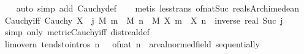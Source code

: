 \begin{isabellebody}
%
\isadelimproof
\ \ %
\endisadelimproof
%
\isatagproof
{}\isamarkupfalse%
\ {\isacharparenleft}{\kern0pt}auto\ simp\ add{\isacharcolon}{\kern0pt}\ Cauchy{\isacharunderscore}{\kern0pt}def{\isacharparenright}{\kern0pt}\isanewline
\ \ \isamarkupfalse%
\ {\isacharparenleft}{\kern0pt}metis\ less{\isacharunderscore}{\kern0pt}trans\ of{\isacharunderscore}{\kern0pt}nat{\isacharunderscore}{\kern0pt}Suc\ reals{\isacharunderscore}{\kern0pt}Archimedean{\isacharparenright}{\kern0pt}%
\endisatagproof
{\isafoldproof}%
%
\isadelimproof
\isanewline
%
\endisadelimproof
\isanewline
{}\isamarkupfalse%
\ Cauchy{\isacharunderscore}{\kern0pt}iff{}{\isacharcolon}{\kern0pt}\ {\isachardoublequoteopen}Cauchy\ X\ {\isasymlongleftrightarrow}\ {\isacharparenleft}{\kern0pt}{\isasymforall}j{\isachardot}{\kern0pt}\ {\isacharparenleft}{\kern0pt}{\isasymexists}M{\isachardot}{\kern0pt}\ {\isasymforall}m\ {\isasymge}\ M{\isachardot}{\kern0pt}\ {\isasymforall}n\ {\isasymge}\ M{\isachardot}{\kern0pt}\ {\isasymbar}X\ m\ {\isacharminus}{\kern0pt}\ X\ n{\isasymbar}\ {\isacharless}{\kern0pt}\ inverse\ {\isacharparenleft}{\kern0pt}real\ {\isacharparenleft}{\kern0pt}Suc\ j{\isacharparenright}{\kern0pt}{\isacharparenright}{\kern0pt}{\isacharparenright}{\kern0pt}{\isacharparenright}{\kern0pt}{\isachardoublequoteclose}\isanewline
%
\isadelimproof
\ \ %
\endisadelimproof
%
\isatagproof
{}\isamarkupfalse%
\ {\isacharparenleft}{\kern0pt}simp\ only{\isacharcolon}{\kern0pt}\ metric{\isacharunderscore}{\kern0pt}Cauchy{\isacharunderscore}{\kern0pt}iff{}\ dist{\isacharunderscore}{\kern0pt}real{\isacharunderscore}{\kern0pt}def{\isacharparenright}{\kern0pt}%
\endisatagproof
{\isafoldproof}%
%
\isadelimproof
\isanewline
%
\endisadelimproof
\isanewline
{}\isamarkupfalse%
\ lim{\isacharunderscore}{\kern0pt}{}{\isacharunderscore}{\kern0pt}over{\isacharunderscore}{\kern0pt}n\ {\isacharbrackleft}{\kern0pt}tendsto{\isacharunderscore}{\kern0pt}intros{\isacharbrackright}{\kern0pt}{\isacharcolon}{\kern0pt}\ {\isachardoublequoteopen}{\isacharparenleft}{\kern0pt}{\isacharparenleft}{\kern0pt}{\isasymlambda}n{\isachardot}{\kern0pt}\ {}\ {\isacharslash}{\kern0pt}\ of{\isacharunderscore}{\kern0pt}nat\ n{\isacharparenright}{\kern0pt}\ {\isasymlonglongrightarrow}\ {\isacharparenleft}{\kern0pt}{}{\isacharcolon}{\kern0pt}{\isacharcolon}{\kern0pt}{\isacharprime}{\kern0pt}a{\isacharcolon}{\kern0pt}{\isacharcolon}{\kern0pt}real{\isacharunderscore}{\kern0pt}normed{\isacharunderscore}{\kern0pt}field{\isacharparenright}{\kern0pt}{\isacharparenright}{\kern0pt}\ sequentially{\isachardoublequoteclose}\isanewline

\end{isabellebody}
